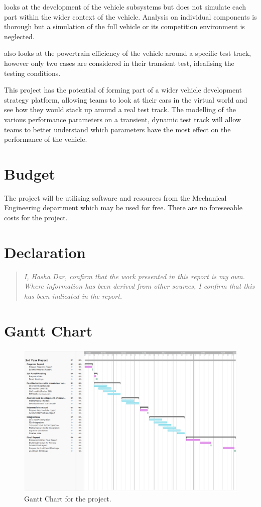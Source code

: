 \documentclass{article}
\begin{document}
\citep{Dol2016} looks at the development of the vehicle subsystems but does not simulate each part within the wider context of the vehicle. Analysis on individual components is thorough but a simulation of the full vehicle or its competition environment is neglected.

\citep{Wei2019} also looks at the powertrain efficiency of the vehicle around a specific test track, however only two cases are considered in their transient test, idealising the testing conditions.

This project has the potential of forming part of a wider vehicle development strategy platform, allowing teams to look at their cars in the virtual world and see how they would stack up around a real test track. The modelling of the various performance parameters on a transient, dynamic test track will allow teams to better understand which parameters have the most effect on the performance of the vehicle.
\section{Budget}
The project will be utilising software and resources from the Mechanical Engineering department which may be used for free. There are no foreseeable costs for the project.
\section{Declaration}
\begin{quote}
	\textit{I, Hasha Dar, confirm that the work presented in this report is my own. Where information has been derived from	other sources, I confirm that this has been indicated in the report.}
\end{quote}
\section{Gantt Chart}
\begin{figure}[h]
	\centering
	\includegraphics[width = 0.83 \textwidth]{./img/GanttChartProgressReport.png}
	\caption{Gantt Chart for the project.}
\end{figure}





\end{document}
